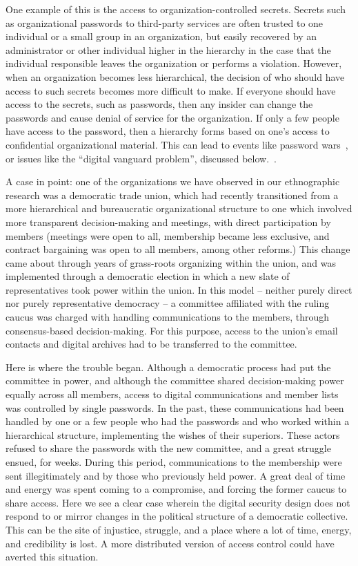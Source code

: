One example of this is the access to organization-controlled secrets. Secrets
such as organizational passwords to third-party services are often trusted to
one individual or a small group in an organization, but easily recovered by an
administrator or other individual higher in the hierarchy in the case that the
individual responsible leaves the organization or performs a violation. However,
when an organization becomes less hierarchical, the decision of who should have
access to such secrets becomes more difficult to make. If everyone should have
access to the secrets, such as passwords, then any insider can change the
passwords and cause denial of service for the organization. If only a few people
have access to the password, then a hierarchy forms based on one's access to
confidential organizational material. This can lead to events like password 
wars~\cite{kavada2020counterpublics}, or issues like the ``digital vanguard
problem'', discussed below.~\cite{gerbaudo2017social}.

A case in point: one of the organizations we have observed in our ethnographic
research was a democratic trade union, which had recently transitioned from a
more hierarchical and bureaucratic organizational structure to one which
involved more transparent decision-making and meetings, with direct
participation by members (meetings were open to all, membership became less
exclusive, and contract bargaining was open to all members, among other
reforms.) This change came about through years of grass-roots organizing within
the union, and was implemented through a democratic election in which a new
slate of representatives took power within the union. In this model -- neither
purely direct nor purely representative democracy -- a committee affiliated with
the ruling caucus was charged with handling communications to the members,
through consensus-based decision-making. For this purpose, access to the union's
email contacts and digital archives had to be transferred to the committee. 

Here is where the trouble began. Although a democratic process had put the
committee in power, and although the committee shared decision-making power
equally across all members, access to digital communications and member lists
was controlled by single passwords. In the past, these communications had been
handled by one or a few people who had the passwords and who worked within a
hierarchical structure, implementing the wishes of their superiors. These actors
refused to share the passwords with the new committee, and a great struggle
ensued, for weeks. During this period, communications to the membership were
sent illegitimately and by those who previously held power. A great deal of time
and energy was spent coming to a compromise, and forcing the former caucus to
share access. Here we see a clear case wherein the digital security design does
not respond to or mirror changes in the political structure of a democratic
collective. This can be the site of injustice, struggle, and a place where a lot
of time, energy, and credibility is lost. A more distributed version of access
control could have averted this situation.

